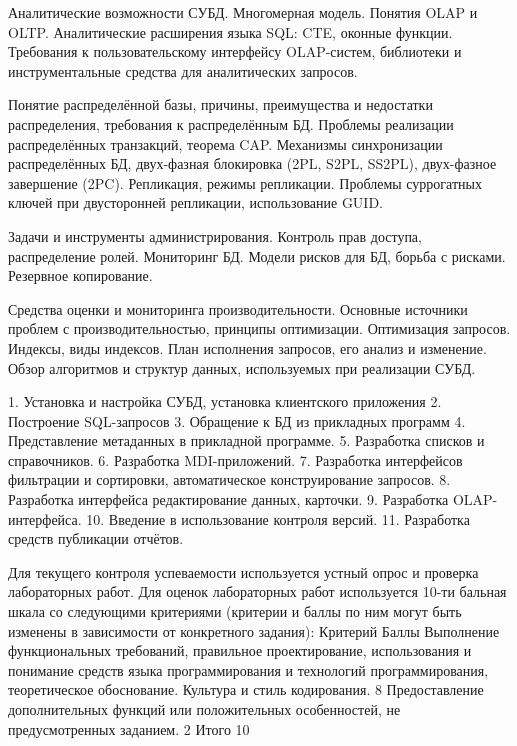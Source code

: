 \documentclass[a4paper]{article}
\begin{document}
	Аналитические возможности СУБД.  Многомерная модель. Понятия OLAP и OLTP. Аналитические расширения языка SQL: CTE, оконные функции.
	Требования к пользовательскому интерфейсу OLAP-систем, библиотеки и инструментальные средства для аналитических запросов.

	Понятие распределённой базы, причины, преимущества и недостатки распределения, требования к распределённым БД. Проблемы реализации распределённых транзакций, теорема CAP.
	Механизмы синхронизации распределённых БД, двух-фазная блокировка (2PL, S2PL, SS2PL), двух-фазное завершение (2PC).
	Репликация, режимы репликации. Проблемы суррогатных ключей при двусторонней репликации, использование GUID.

	Задачи и инструменты администрирования. Контроль прав доступа, распределение ролей. Мониторинг БД.
	Модели рисков для БД, борьба с рисками. Резервное копирование.

	Средства оценки и мониторинга производительности. Основные источники проблем с производительностью, принципы оптимизации.
	Оптимизация запросов. Индексы, виды индексов. План исполнения запросов, его анализ и изменение.
	Обзор алгоритмов и структур данных, используемых при реализации СУБД.

\CoursePracticeSection

1.	Установка и настройка СУБД, установка клиентского приложения
2.	Построение SQL-запросов
3.	Обращение к БД из прикладных программ
4.	Представление метаданных в прикладной программе.
5.	Разработка списков и справочников.
6.	Разработка MDI-приложений.
7.	Разработка интерфейсов фильтрации и сортировки, автоматическое конструирование запросов.
8.	Разработка интерфейса редактирование данных, карточки.
9.	Разработка OLAP-интерфейса.
10.	Введение в использование контроля версий.
11.	Разработка средств публикации отчётов.

\CourseControlSection

Для текущего контроля успеваемости используется устный опрос и проверка лабораторных работ.
Для оценок лабораторных работ используется 10-ти бальная шкала со следующими критериями (критерии и баллы по ним могут быть изменены в зависимости от конкретного задания):
Критерий	Баллы
Выполнение функциональных требований, правильное проектирование, использования и понимание средств языка программирования и технологий программирования, теоретическое обоснование. Культура и стиль кодирования.	8
Предоставление дополнительных функций или положительных особенностей, не предусмотренных заданием.	2
Итого	10
\end{document}
